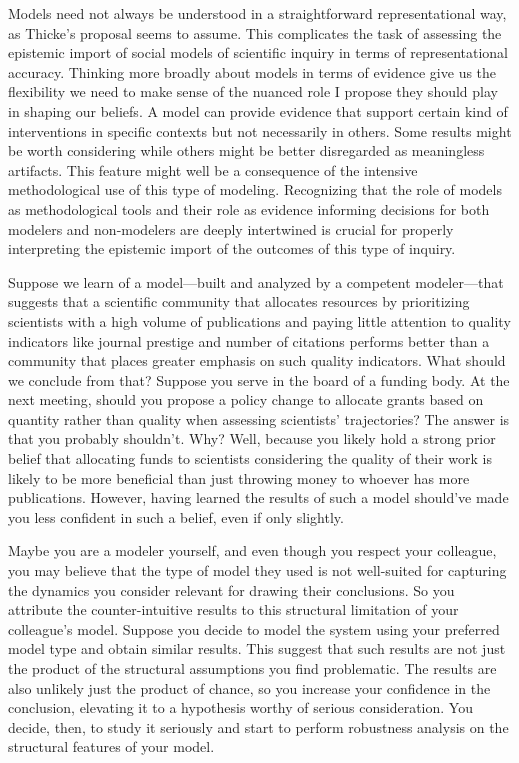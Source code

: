 \documentclass{article}
\begin{document}
Models need not always be understood in a straightforward representational way, as Thicke's proposal seems to assume. This complicates the task of assessing the epistemic import of social models of scientific inquiry in terms of representational accuracy. Thinking more broadly about models in terms of evidence give us the flexibility we need to make sense of the nuanced role I propose they should play in shaping our beliefs. A model can provide evidence that support certain kind of interventions in specific contexts but not necessarily in others. Some results might be worth considering while others might be better disregarded as meaningless artifacts. This feature might well be a consequence of the intensive methodological use of this type of modeling. Recognizing that the role of models as methodological tools and their role as evidence informing decisions for both modelers and non-modelers are deeply intertwined is crucial for properly interpreting the epistemic import of the outcomes of this type of inquiry.  

Suppose we learn of a model—built and analyzed by a competent modeler—that suggests that a scientific community that allocates resources by prioritizing scientists with a high volume of publications and paying little attention to quality indicators like journal prestige and number of citations performs better than a community that places greater emphasis on such quality indicators. What should we conclude from that? Suppose you serve in the board of a funding body. At the next meeting, should you propose a policy change to allocate grants based on quantity rather than quality when assessing scientists' trajectories? The answer is that you probably shouldn't. Why? Well, because you likely hold a strong prior belief that allocating funds to scientists considering the quality of their work is likely to be more beneficial than just throwing money to whoever has more publications. However, having learned the results of such a model should've made you less confident in such a belief, even if only slightly.

Maybe you are a modeler yourself, and even though you respect your colleague, you may believe that the type of model they used is not well-suited for capturing the dynamics you consider relevant for drawing their conclusions. So you attribute the counter-intuitive results to this structural limitation of your colleague's model. Suppose you decide to model the system using your preferred model type and obtain similar results. This suggest that such results are not just the product of the structural assumptions you find problematic. The results are also unlikely just the product of chance, so you increase your confidence in the conclusion, elevating it to a hypothesis worthy of serious consideration. You decide, then, to study it seriously and start to perform robustness analysis on the structural features of your model.
\end{document}
